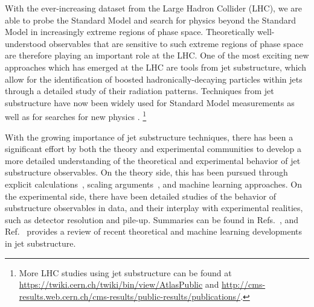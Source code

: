 \documentclass[11pt,letterpaper]{article}
\begin{document}
With the ever-increasing dataset from the Large Hadron Collider (LHC), we are able to probe the Standard Model and search for physics beyond the Standard Model in increasingly extreme regions of phase space.
%
Theoretically well-understood observables that are sensitive to such extreme regions of phase space are therefore playing an important role at the LHC.
%
One of the most exciting new approaches which has emerged at the LHC are tools from jet substructure, which allow for the identification of boosted hadronically-decaying particles within jets through a detailed study of their radiation patterns.
%
Techniques from jet substructure have now been widely used for Standard Model measurements \cite{Chatrchyan:2012sn,CMS:2013cda,Aad:2015cua,Aad:2015lxa,ATLAS-CONF-2015-035,Aad:2015rpa,Aad:2015hna,ATLAS-CONF-2016-002,ATLAS-CONF-2016-039,ATLAS-CONF-2016-034,CMS-PAS-TOP-16-013,CMS-PAS-HIG-16-004} as well as for searches for new physics  \cite{CMS:2011bqa,Fleischmann:2013woa,Pilot:2013bla,TheATLAScollaboration:2013qia,Chatrchyan:2012ku,CMS-PAS-B2G-14-001,CMS-PAS-B2G-14-002,Khachatryan:2015axa,Khachatryan:2015bma,Aad:2015owa,Aaboud:2016okv,Aaboud:2016trl,Aaboud:2016qgg,ATLAS-CONF-2016-055,ATLAS-CONF-2015-071,ATLAS-CONF-2015-068,CMS-PAS-EXO-16-037,CMS-PAS-EXO-16-040,Khachatryan:2016mdm,CMS-PAS-HIG-16-016,CMS-PAS-B2G-15-003,CMS-PAS-EXO-16-017}.%
\footnote{More LHC studies using jet substructure can be found at \url{https://twiki.cern.ch/twiki/bin/view/AtlasPublic} and \url{http://cms-results.web.cern.ch/cms-results/public-results/publications/}.} 

With the growing importance of jet substructure techniques, there has been a significant effort by both the theory and experimental communities to develop a more detailed understanding of the theoretical and experimental behavior of jet substructure observables.
%
On the theory side, this has been pursued through explicit calculations~\cite{Feige:2012vc,Field:2012rw,Dasgupta:2013ihk,Dasgupta:2013via,Larkoski:2014pca,Dasgupta:2015yua,Seymour:1997kj,Li:2011hy,Larkoski:2012eh,Jankowiak:2012na,Chien:2014nsa,Chien:2014zna,Isaacson:2015fra,Krohn:2012fg,Waalewijn:2012sv,Larkoski:2014tva,Procura:2014cba,Bertolini:2015pka,Bhattacherjee:2015psa,Larkoski:2015kga,Dasgupta:2015lxh,Frye:2016okc,Frye:2016aiz,Kang:2016ehg,Hornig:2016ahz,Marzani:2017mva,Marzani:2017kqd,Hoang:2017kmk,Larkoski:2017cqq,Larkoski:2017iuy}, scaling arguments~\cite{Walsh:2011fz,Larkoski:2014gra,Larkoski:2014zma}, and machine learning \cite{Cogan:2014oua,deOliveira:2015xxd,Almeida:2015jua,Baldi:2016fql,Guest:2016iqz,Conway:2016caq,Barnard:2016qma} approaches.
%
On the experimental side, there have been detailed studies of the behavior of substructure observables in data, and their interplay with experimental realities, such as detector resolution and pile-up.
%
Summaries can be found in Refs.~\cite{Abdesselam:2010pt,Altheimer:2012mn,Altheimer:2013yza,Adams:2015hiv}, and Ref.~\cite{Larkoski:2017jix} provides a review of recent theoretical and machine learning developments in jet substructure. 
\end{document}
